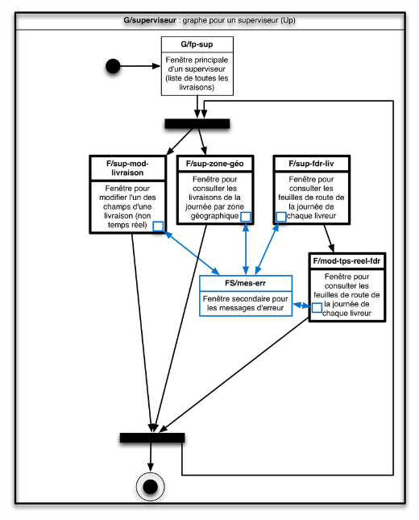 \documentclass{report}
\begin{document}
\paragraph{}
~~\\
\begin{center}
\includegraphics[scale = 0.2]{images/g-sup.jpg}
\end{center}
\end{document}
